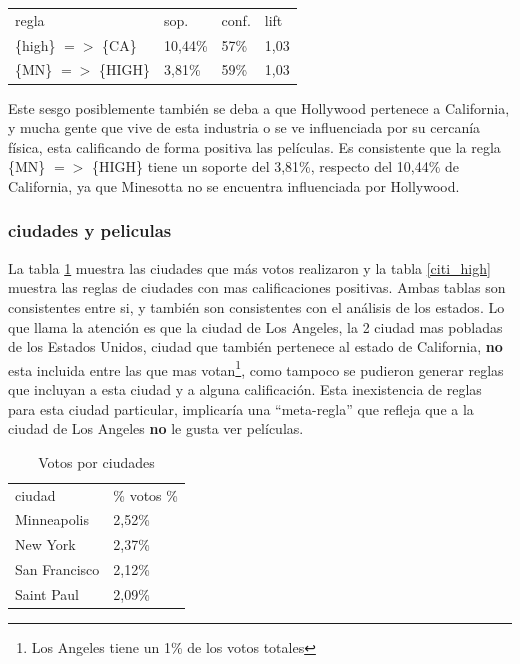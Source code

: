 \documentclass[journal]{IEEEtran}
\begin{document}
\begin{table}[ht!]
\centering
\begin{tabular}{l l l l }
regla & sop. & conf. & lift \\
\{high\} $=$$>$ \{CA\} & 10,44\% & 57\% & 1,03 \\
\{MN\} $=$$>$ \{HIGH\} & 3,81\% & 59\% & 1,03 
\end{tabular}
\end{table}

Este sesgo posiblemente también se deba a que Hollywood pertenece a California,
y mucha gente que vive de esta industria o se ve influenciada por su cercanía
física, 
esta calificando de forma positiva las películas. Es consistente que la regla
\{MN\} $=$$>$ \{HIGH\} tiene un soporte del 3,81\%, respecto del 10,44\% de 
California, ya que Minesotta no se encuentra influenciada por Hollywood.

\subsubsection{ciudades y peliculas}
La tabla \ref{citi_votes} muestra las ciudades que más votos realizaron y
la tabla \ref{citi_high} muestra las reglas de ciudades con mas calificaciones
positivas. Ambas tablas son consistentes entre si, y también son consistentes
con el análisis de los estados. Lo que llama la atención es que la ciudad de Los
Angeles, la 2 ciudad mas  pobladas de los Estados Unidos, 
ciudad que también pertenece al estado de California, 
\textbf{no} esta incluida entre las que mas votan\footnote{Los Angeles tiene
un 1\% de los votos totales}, como tampoco se pudieron generar reglas que 
incluyan a esta ciudad y a alguna calificación. Esta inexistencia
de reglas para esta ciudad particular, implicaría una ``meta-regla'' que
refleja que a la ciudad de Los Angeles \textbf{no} le gusta ver películas.
 
\begin{table}[ht!]
\caption{Votos por ciudades}
\label{citi_votes}
\centering
\begin{tabular}{l l }
ciudad & \% votos \% \\
Minneapolis & 2,52\% \\
New York & 2,37\% \\
San Francisco & 2,12\% \\
Saint Paul & 2,09\%  \\
\end{tabular}
\end{table}
\end{document}
